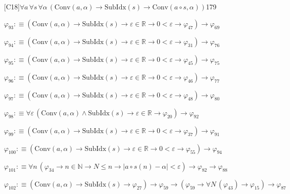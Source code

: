\begin{fullproof}{[C18]}{$\forall a\,\forall s\,\forall \alpha\,(\mathrm{Conv}(a,\alpha) \to \mathrm{SubIdx}(s) \to \mathrm{Conv}(a \circ s,\alpha))$}{179}
\begin{abbrevlist}
\item $\varphi_{93} :\equiv (\mathrm{Conv}(a,\alpha) \to \mathrm{SubIdx}(s) \to \varepsilon \in \mathbb{R} \to 0 < \varepsilon \to \varphi_{47}) \to \varphi_{69}$
\item $\varphi_{94} :\equiv (\mathrm{Conv}(a,\alpha) \to \mathrm{SubIdx}(s) \to \varepsilon \in \mathbb{R} \to 0 < \varepsilon \to \varphi_{31}) \to \varphi_{76}$
\item $\varphi_{95} :\equiv (\mathrm{Conv}(a,\alpha) \to \mathrm{SubIdx}(s) \to \varepsilon \in \mathbb{R} \to 0 < \varepsilon \to \varphi_{45}) \to \varphi_{75}$
\item $\varphi_{96} :\equiv (\mathrm{Conv}(a,\alpha) \to \mathrm{SubIdx}(s) \to \varepsilon \in \mathbb{R} \to 0 < \varepsilon \to \varphi_{46}) \to \varphi_{77}$
\item $\varphi_{97} :\equiv (\mathrm{Conv}(a,\alpha) \to \mathrm{SubIdx}(s) \to \varepsilon \in \mathbb{R} \to 0 < \varepsilon \to \varphi_{48}) \to \varphi_{80}$
\item $\varphi_{98} :\equiv \forall \varepsilon\,(\mathrm{Conv}(a,\alpha) \land \mathrm{SubIdx}(s) \to \varepsilon \in \mathbb{R} \to \varphi_{20}) \to \varphi_{92}$
\item $\varphi_{99} :\equiv (\mathrm{Conv}(a,\alpha) \to \mathrm{SubIdx}(s) \to \varepsilon \in \mathbb{R} \to 0 < \varepsilon \to \varphi_{37}) \to \varphi_{91}$
\item $\varphi_{100} :\equiv (\mathrm{Conv}(a,\alpha) \to \mathrm{SubIdx}(s) \to \varepsilon \in \mathbb{R} \to 0 < \varepsilon \to \varphi_{55}) \to \varphi_{94}$
\item $\varphi_{101} :\equiv \forall n\,(\varphi_{34} \to n \in \mathbb{N} \to N \leq n \to \lvert a \circ s(n) - \alpha \rvert < \varepsilon) \to \varphi_{82} \to \varphi_{88}$
\item $\varphi_{102} :\equiv (\mathrm{Conv}(a,\alpha) \to \mathrm{SubIdx}(s) \to \varphi_{27}) \to \varphi_{59} \to (\varphi_{59} \to \forall N\,(\varphi_{43}) \to \varphi_{15}) \to \varphi_{87}$
\end{abbrevlist}
\end{fullproof}
